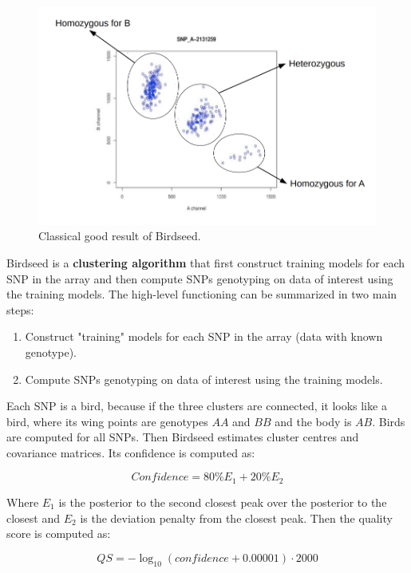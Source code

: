 			\begin{figure}[H]
				\centering
				\includegraphics[scale=0.3]{birdseed}
				\caption{Classical good result of Birdseed.}
				\label{fig:birdseed}
			\end{figure}

			Birdseed is a \textbf{clustering algorithm} that first construct training models for each SNP in the array and then compute SNPs genotyping on data of interest using the training models.
			The high-level functioning can be summarized in two main steps:

			\begin{multicols}{2}
				\begin{enumerate}
					\item Construct "training" models for each SNP in the array (data with known genotype).
					\item Compute SNPs genotyping on data of interest using the training models.
				\end{enumerate}
			\end{multicols}

			Each SNP is a bird, because if the three clusters are connected, it looks like a bird, where its wing points are genotypes $AA$ and $BB$ and the body is $AB$.
			Birds are computed for all SNPs.
			Then Birdseed estimates cluster centres and covariance matrices.
			Its confidence is computed as:

			$$Confidence = 80\% E_1 + 20\% E_2$$

			Where $E_1$ is the posterior to the second closest peak over the posterior to the closest and $E_2$ is the deviation penalty from the closest peak.
			Then the quality score is computed as:

			$$QS = -\log_{10}(confidence + 0.00001)\cdot 2000$$

